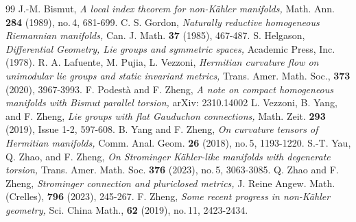 \documentclass[10pt,a4paper]{amsart}
\theoremstyle{plain}
\theoremstyle{remark}
\begin{document}
\begin{thebibliography}{99}
 J.-M. Bismut, \emph{A local index theorem for non-K\"ahler manifolds,} Math. Ann. {\bf 284} (1989), no.\,4, 681-699.
 C. S. Gordon, \emph{Naturally reductive homogeneous Riemannian manifolds,} Can. J. Math. \textbf{37} (1985), 467-487.
 S. Helgason, \emph{Differential Geometry, Lie groups and symmetric spaces,} Academic Press, Inc. (1978).
 R. A. Lafuente, M. Pujia, L. Vezzoni, \emph{Hermitian curvature flow on unimodular lie groups and static invariant metrics,} Trans. Amer. Math. Soc., \textbf{373} (2020), 3967-3993.
 F. Podest\`a and F. Zheng, \emph{A note on compact homogeneous manifolds with Bismut parallel torsion,} arXiv: 2310.14002
 L. Vezzoni, B. Yang, and F. Zheng, \emph{ Lie groups with flat Gauduchon connections,} Math. Zeit. \textbf{293} (2019), Issue 1-2, 597-608.
 B. Yang and F. Zheng, \emph{On curvature tensors of Hermitian manifolds,} Comm. Anal. Geom. {\bf 26} (2018), no.\,5, 1193-1220.
 S.-T. Yau, Q. Zhao, and F. Zheng, \emph{On Strominger K\"ahler-like manifolds with degenerate torsion,} Trans. Amer. Math. Soc. \textbf{376} (2023), no.\,5, 3063-3085.
 Q. Zhao and F. Zheng, \emph{Strominger connection and pluriclosed metrics,} J. Reine Angew. Math. (Crelles), \textbf{796} (2023), 245-267.
 F. Zheng, \emph{Some recent progress in non-K\"ahler geometry,} Sci. China Math., {\bf 62} (2019), no.\,11, 2423-2434.
\end{thebibliography}
\end{document}
